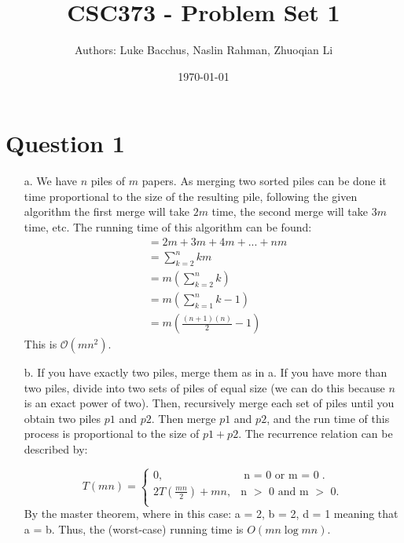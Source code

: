 \documentclass[12pt]{article}
\title{\textbf{CSC373 - Problem Set 1}}
\author{Authors: Luke Bacchus, Naslin Rahman, Zhuoqian Li}
\date{\today}
\begin{document}
\maketitle
\section*{Question 1}
\begin{enumerate}
    \item[a.] We have $n$ piles of $m$ papers. As merging two sorted piles can be done it time proportional to the size of the resulting pile, following the given algorithm the first merge will take $2m$ time, the second merge will take $3m$ time, etc. 
    The running time of this algorithm can be found:
    \begin{align*}
        &= 2m + 3m + 4m + ... + nm \\
        &= \sum_{k=2}^n km \\
        &= m(\sum_{k=2}^n k) \\
        &= m(\sum_{k=1}^n k-1) \\
        &= m(\frac{(n+1)(n)}{2} - 1)
    \end{align*}
    This is $\mathcal{O}(mn^2)$.
    \item[b.] If you have exactly two piles, merge them as in a. If you have more than two piles, divide into two sets of piles of equal size (we can do this because $n$ is an exact power of two). 
    Then, recursively merge each set of piles until you obtain two piles $p1$ and $p2$. Then merge $p1$ and $p2$, and the run time of this process is proportional to the size of $p1 + p2$. The recurrence relation can be described by:
    
    \begin{equation}
        T(mn) = \begin{cases}
          0, & \text{n = 0 or m $=$ 0}.\\
          2T(\frac{mn}{2}) + mn, & \text{n $>$ 0 and m $>$ 0}.\\
    \end{cases}
    \end{equation}
By the master theorem, where in this case: a = 2, b = 2, d = 1 meaning that a = b. Thus, the (worst-case) running time is $O(mn \log mn)$.\end{enumerate}
\newpage
\end{document}
